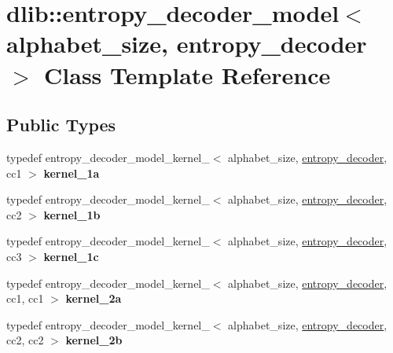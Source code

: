 \hypertarget{classdlib_1_1entropy__decoder__model}{
\section{dlib::entropy\_\-decoder\_\-model$<$ alphabet\_\-size, entropy\_\-decoder $>$ Class Template Reference}
\label{classdlib_1_1entropy__decoder__model}
}
\subsection*{Public Types}
\begin{DoxyCompactItemize}
\item 
\hypertarget{classdlib_1_1entropy__decoder__model_a1671912b73a04a01e27fd582c8e4d6b1}{
typedef entropy\_\-decoder\_\-model\_\-kernel\_$<$ alphabet\_\-size, \hyperlink{classdlib_1_1entropy__decoder}{entropy\_\-decoder}, cc1 $>$ {\bfseries kernel\_\-1a}}
\label{classdlib_1_1entropy__decoder__model_a1671912b73a04a01e27fd582c8e4d6b1}

\item 
\hypertarget{classdlib_1_1entropy__decoder__model_a8e365a04a3dd0dafbda75f22577c1ef3}{
typedef entropy\_\-decoder\_\-model\_\-kernel\_$<$ alphabet\_\-size, \hyperlink{classdlib_1_1entropy__decoder}{entropy\_\-decoder}, cc2 $>$ {\bfseries kernel\_\-1b}}
\label{classdlib_1_1entropy__decoder__model_a8e365a04a3dd0dafbda75f22577c1ef3}

\item 
\hypertarget{classdlib_1_1entropy__decoder__model_a9160a0902abe5f6d3c8c9ae06c0959fd}{
typedef entropy\_\-decoder\_\-model\_\-kernel\_$<$ alphabet\_\-size, \hyperlink{classdlib_1_1entropy__decoder}{entropy\_\-decoder}, cc3 $>$ {\bfseries kernel\_\-1c}}
\label{classdlib_1_1entropy__decoder__model_a9160a0902abe5f6d3c8c9ae06c0959fd}

\item 
\hypertarget{classdlib_1_1entropy__decoder__model_a227d0988724460290cbdd84935b23f7e}{
typedef entropy\_\-decoder\_\-model\_\-kernel\_$<$ alphabet\_\-size, \hyperlink{classdlib_1_1entropy__decoder}{entropy\_\-decoder}, cc1, cc1 $>$ {\bfseries kernel\_\-2a}}
\label{classdlib_1_1entropy__decoder__model_a227d0988724460290cbdd84935b23f7e}

\item 
\hypertarget{classdlib_1_1entropy__decoder__model_aa1dc8470ffa66eb9d27859d300d35082}{
typedef entropy\_\-decoder\_\-model\_\-kernel\_$<$ alphabet\_\-size, \hyperlink{classdlib_1_1entropy__decoder}{entropy\_\-decoder}, cc2, cc2 $>$ {\bfseries kernel\_\-2b}}
\label{classdlib_1_1entropy__decoder__model_aa1dc8470ffa66eb9d27859d300d35082}


\end{DoxyCompactItemize}
